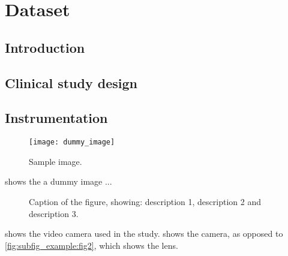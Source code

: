 \chapter{Dataset}
\label{chapter:dataset} 


\section{Introduction}

\lipsum[2-4]

\section{Clinical study design}

\lipsum[2-4]

\section{Instrumentation}


\begin{figure}[tbh]
  \centering
  \texttt{[image: dummy\_image]}
  \caption[Sample image]
  {
      Sample image.
      \label{fig:sample_image}
  }
  
\end{figure}

 shows the a dummy image ...


\lipsum[2-4]

\begin{figure}[tbh]
  \centering
  \caption[The PointGrey Grasshopper2 video camera]
  {
      Caption of the figure, showing:
       description 1,
       description 2 and
       description 3.
      \label{fig:subfig_example}
  }
\end{figure}

 shows the video camera used in the study.  shows the camera, as opposed to \cref{fig:subfig_example:fig2}, which shows the lens.

